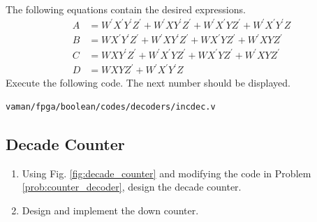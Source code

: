 \documentclass[journal,12pt,twocolumn]{IEEEtran}
\renewcommand\thesection{\arabic{section}}
\renewcommand\thesubsection{\thesection.\arabic{subsection}}
\begin{document}
\begin{enumerate}[label=\thesubsection.\arabic*.,ref=\thesubsection.\theenumi]
%
\\
\solution The following equations contain the desired expressions.
\begin{align}
\label{eq:vaman/fpga/boolean/inc_A}
A &= W^{\prime}X^{\prime}Y^{\prime}Z^{\prime} + W^{\prime}XY^{\prime}Z^{\prime}
+W^{\prime}X^{\prime}YZ^{\prime}
+W^{\prime}X^{\prime}Y^{\prime}Z
\\
\label{eq:vaman/fpga/boolean/inc_B}
B &= WX^{\prime}Y^{\prime}Z^{\prime} + W^{\prime}XY^{\prime}Z^{\prime}
+WX^{\prime}YZ^{\prime}
+W^{\prime}XYZ^{\prime}
\\
\label{eq:vaman/fpga/boolean/inc_C}
C &= WXY^{\prime}Z^{\prime} + W^{\prime}X^{\prime}YZ^{\prime}
+WX^{\prime}YZ^{\prime}
+W^{\prime}XYZ^{\prime}
\\
D &= WXYZ^{\prime} + W^{\prime}X^{\prime}Y^{\prime}Z
\label{eq:vaman/fpga/boolean/inc_D}
\end{align}
Execute the following code.  The next number should be displayed.
\begin{lstlisting}
vaman/fpga/boolean/codes/decoders/incdec.v
\end{lstlisting}
\end{enumerate}
%
\subsection{Decade Counter}
\renewcommand{\theequation}{\theenumi}
\renewcommand{\thefigure}{\theenumi}
\begin{enumerate}[label=\thesubsection.\arabic*.,ref=\thesubsection.\theenumi]

\item Using Fig. \ref{fig:decade_counter} and modifying the code in Problem \ref{prob:counter_decoder}, design the decade counter.
%
\item Design and implement the down counter.
\end{enumerate}
%
\end{document}
